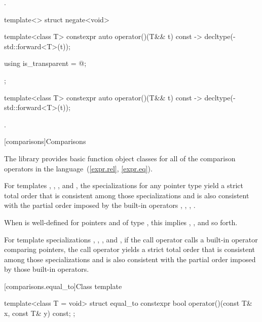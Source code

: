 \begin{itemdescr}
\pnum\returns {}.
\end{itemdescr}

%
\begin{itemdecl}
template<> struct negate<void> {
  template<class T> constexpr auto operator()(T&& t) const
    -> decltype(-std::forward<T>(t));

  using is_transparent = @\unspec@;
};
\end{itemdecl}

%
\begin{itemdecl}
template<class T> constexpr auto operator()(T&& t) const
    -> decltype(-std::forward<T>(t));
\end{itemdecl}

\begin{itemdescr}
\pnum\returns {}.
\end{itemdescr}


[comparisons]{Comparisons}

\pnum
The library provides basic function object classes for all of the comparison
operators in the language~(\ref{expr.rel}, \ref{expr.eq}).

\pnum
For templates , , , and
, the specializations for any pointer type
yield a strict total order that is consistent among those specializations and
is also consistent with the partial order imposed by
the built-in operators \tcode{<}, \tcode{>}, \tcode{<=}, \tcode{>=}.
\begin{note} When  is well-defined
for pointers  and  of type ,
this implies ,
, and so forth. \end{note}
For template specializations , ,
, and ,
if the call operator calls a built-in operator comparing pointers,
the call operator yields a strict total order
that is consistent among those specializations and
is also consistent with the partial order imposed by those built-in operators.

[comparisons.equal_to]{Class template }

%
\begin{itemdecl}
template<class T = void> struct equal_to {
  constexpr bool operator()(const T& x, const T& y) const;
};
\end{itemdecl}

